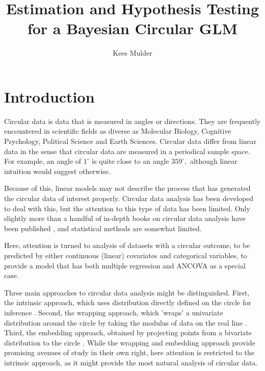 \documentclass[10pt,a4paper]{article}\usepackage[]{graphicx}\usepackage[]{color}
\author{Kees Mulder}
\title{Estimation and Hypothesis Testing for a Bayesian Circular GLM}
\begin{document}
\maketitle

\tableofcontents

\newcommand{\bx}{\boldsymbol{x}}
\newcommand{\bX}{\boldsymbol{X}}
\newcommand{\bt}{\boldsymbol{\theta}}
\newcommand{\bd}{\boldsymbol{d}}
\newcommand{\bdt}{\boldsymbol{\delta}}
\newcommand{\bbt}{\boldsymbol{\beta}}
\newcommand{\bps}{\boldsymbol{\psi}}




\section{Introduction}

Circular data is data that is measured in angles or directions. They are frequently encountered in scientific fields as diverse as Molecular Biology, Cognitive Psychology, Political Science \citep{gill2010} and Earth Sciences. Circular data differ from linear data in the sense that circular data are measured in a periodical sample space. For example, an angle of $1^{\circ}$ is quite close to an angle $359^{\circ},$ although linear intuition would suggest otherwise.

Because of this, linear models may not describe the process that has generated the circular data of interest properly. Circular data analysis has been developed to deal with this, but the attention to this type of data has been limited. Only slightly more than a handful of in-depth books on circular data analysis have been published \citep{fisher1995statistical, mardia1999directional, pewsey2013circular}, and statistical methods are somewhat limited.

Here, attention is turned to analysis of datasets with a circular outcome, to be predicted by either continuous (linear) covariates and categorical variables, to provide a model that has both multiple regression and ANCOVA as a special case.

Three main approaches to circular data analysis might be distinguished. First, the intrinsic approach, which uses distribution directly defined on the circle for inference \citep{fisher1992regression}. Second, the wrapping approach, which 'wraps' a univariate distribution around the circle by taking the modulus of data on the real line \citep{coles1998inference, ferrari2009wrapping}. Third, the embedding approach, obtained by projecting points from a bivariate distribution to the circle \citep{nunez2011bayesian, nunez2014bayesian, Hernandez-Stumpfhauserunpublishedmanuscript}. While the wrapping and embedding approach provide promising avenues of study in their own right, here attention is restricted to the intrinsic approach, as it might provide the most natural analysis of circular data.
\end{document}
